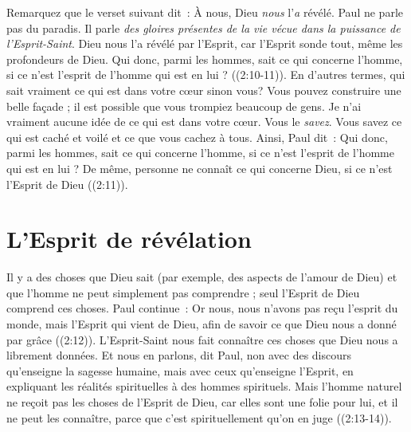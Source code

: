 Remarquez que le verset suivant dit~:
 \og À nous, Dieu \emph{nous} l'\emph{a} révélé. \fg{}
 Paul ne parle pas du paradis.
 Il parle \emph{des gloires présentes de la vie vécue dans la puissance
 de l'Esprit-Saint}.
 \og Dieu nous l'a révélé par l'Esprit, car l'Esprit sonde tout,
 même les profondeurs de Dieu. Qui donc, parmi les hommes,
 sait ce qui concerne l'homme, si ce n'est l'esprit de l'homme
 qui est en lui ? \fg{} ((2:10-11)).
 En d'autres termes, qui sait vraiment ce qui est dans votre cœur sinon vous?
 Vous pouvez construire une belle façade ; il est possible que vous trompiez
 beaucoup de gens.
 Je n'ai vraiment aucune idée de ce qui est dans votre cœur.
 Vous le \emph{savez}.
 Vous savez ce qui est caché et voilé et ce que vous cachez à tous.
 Ainsi, Paul dit~:
 \og Qui donc, parmi les hommes, sait ce qui concerne l'homme,
 si ce n'est l'esprit de l'homme qui est en lui ?
 De même, personne ne connaît ce qui concerne Dieu,
 si ce n'est l'Esprit de Dieu \fg{} ((2:11)).


\section*{L'Esprit de révélation}

\begin{specialpar}{}
Il y a des choses que Dieu sait
 (par exemple, des aspects de l'amour de Dieu)
 et que l'homme ne peut simplement pas comprendre ;
 seul l'Esprit de Dieu comprend ces choses. Paul continue~:
 \og Or nous, nous n'avons pas reçu l'esprit du monde,
 mais l'Esprit qui vient de Dieu, afin de savoir ce que Dieu
 nous a donné par grâce \fg{} ((2:12)).
 L'Esprit-Saint nous fait connaître ces choses que Dieu
 nous a librement données.
 \og Et nous en parlons, dit Paul, non avec des discours qu'enseigne
 la sagesse humaine, mais avec ceux qu'enseigne l'Esprit,
 en expliquant les réalités spirituelles à des hommes spirituels.
 Mais l'homme naturel ne reçoit pas les choses de l'Esprit de Dieu,
 car elles sont une folie pour lui, et il ne peut les connaître,
 parce que c'est spirituellement qu'on en juge \fg{}
 ((2:13-14)).
\end{specialpar}


